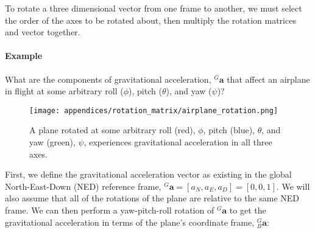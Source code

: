 To rotate a three dimensional vector from one frame to another, we must select the order of the axes to be rotated about, then multiply the rotation matrices and vector together.
\paragraph*{Example} What are the components of gravitational acceleration, ${}^G\pmb{a}$ that affect an airplane in flight at some arbitrary roll ($\phi$), pitch ($\theta$), and yaw ($\psi$)?

\begin{figure}[h!]
    \caption[A plane experiences gravitational acceleration while at some attitude]{A plane rotated at some arbitrary roll (red), $\phi$, pitch (blue), $\theta$, and yaw (green), $\psi$, experiences gravitational acceleration in all three axes.}
    \centering
    \texttt{[image: appendices/rotation\_matrix/airplane\_rotation.png]}
\end{figure}

First, we define the gravitational acceleration vector as existing in the global North-East-Down (NED) reference frame, ${}^G\pmb{a} = \left[ a_N, a_E, a_D \right] = \left[ 0, 0, 1 \right]$.
We will also assume that all of the rotations of the plane are relative to the same NED frame.
We can then perform a yaw-pitch-roll rotation of ${}^G\pmb{a}$ to get the gravitational acceleration in terms of the plane's coordinate frame, ${}^G_B\pmb{a}$:

